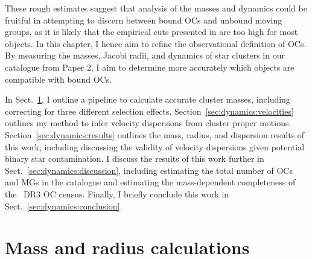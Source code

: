 These rough estimates suggest that analysis of the masses and dynamics could be fruitful in attempting to discern between bound OCs and unbound moving groups, as it is likely that the empirical cuts presented in \cite{cantat-gaudin_clusters_2020} are too high for most objects. In this chapter, I hence aim to refine the observational definition of OCs. By measuring the masses, Jacobi radii, and dynamics of star clusters in our catalogue from Paper 2, I aim to determine more accurately which objects are compatible with bound OCs. 

In Sect.~\ref{sec:dynamics:masses}, I outline a pipeline to calculate accurate cluster masses, including correcting for three different selection effects. Section~\ref{sec:dynamics:velocities} outlines my method to infer velocity dispersions from cluster proper motions. Section~\ref{sec:dynamics:results} outlines the mass, radius, and dispersion results of this work, including discussing the validity of velocity dispersions given potential binary star contamination. I discuss the results of this work further in Sect.~\ref{sec:dynamics:discussion}, including estimating the total number of OCs and MGs in the catalogue and estimating the mass-dependent completeness of the \gaia\ DR3 OC census. Finally, I briefly conclude this work in Sect.~\ref{sec:dynamics:conclusion}.



\section{Mass and radius calculations}
\label{sec:dynamics:masses}


